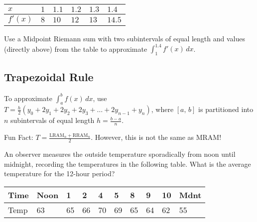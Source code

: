 \begin{questions}
    \begin{longtable}[ht]{|C{1cm}|C{1cm}|C{1cm}|C{1cm}|C{1cm}|C{1cm}|}
        \hline
        $x$\Tstrut\Bstrut & $1$\Tstrut\Bstrut & $1.1$\Tstrut\Bstrut & $1.2$\Tstrut\Bstrut & $1.3$\Tstrut\Bstrut & $1.4$\Tstrut\Bstrut \\\hline
        $f'(x)$\Tstrut\Bstrut & $8$\Tstrut\Bstrut & $10$\Tstrut\Bstrut & $12$\Tstrut\Bstrut & $13$\Tstrut\Bstrut & $14.5$\Tstrut\Bstrut \\\hline
    \end{longtable}
    
    
    \question Use a Midpoint Riemann sum with two subintervals of equal length and values (directly above) from the table to approximate $\displaystyle\int_1^{1.4} f'(x)\,dx$.
    
    
    
\end{questions}


\newpage



\subsection*{Trapezoidal Rule}
\begin{tcolorbox}[title= THE TRAPEZOIDAL RULE, colframe=black,sharp corners,colback=white,colbacktitle=white,coltitle=black,boxrule=1pt]

    To approximate $\displaystyle\int_a^b f(x)\,dx$, use $\displaystyle T=\frac{h}{2}\left(y_0+2y_1+2y_2+2y_3+\dots+2y_{n-1}+y_n\right)$,
    where $[a,\,b]$ is partitioned into $n$ subintervals of equal length $\displaystyle h=\frac{b-a}{n}$.
    
\end{tcolorbox}

Fun Fact: $\displaystyle T=\frac{\text{LRAM}_n+\text{RRAM}_n}{2}$. However, this is not the same as MRAM!\\
\begin{questions}
    \question An observer measures the outside temperature sporadically from noon until midnight, recording the temperatures in the following table. What is the average temperature for the 12-hour period?
    
    \begin{longtable}{|C{.9cm}|C{.9cm}|C{.5cm}|C{.5cm}|C{.5cm}|C{.5cm}|C{.5cm}|C{.5cm}|C{.5cm}|C{1.4cm}|}
        \hline
        Time \Tstrut\Bstrut & Noon \Tstrut\Bstrut & 1 \Tstrut\Bstrut & 2 \Tstrut\Bstrut & 4 \Tstrut\Bstrut & 5 \Tstrut\Bstrut & 8 \Tstrut\Bstrut & 9 \Tstrut\Bstrut & 10\Tstrut\Bstrut & Mdnt \Tstrut\Bstrut \\\hline
        Temp \Tstrut\Bstrut & 63\Tstrut\Bstrut & 65\Tstrut\Bstrut & 66\Tstrut\Bstrut & 70\Tstrut\Bstrut & 69\Tstrut\Bstrut & 65\Tstrut\Bstrut & 64\Tstrut\Bstrut & 62\Tstrut\Bstrut & 55\Tstrut\Bstrut \\\hline
    \end{longtable}  
    
    
\end{questions}

